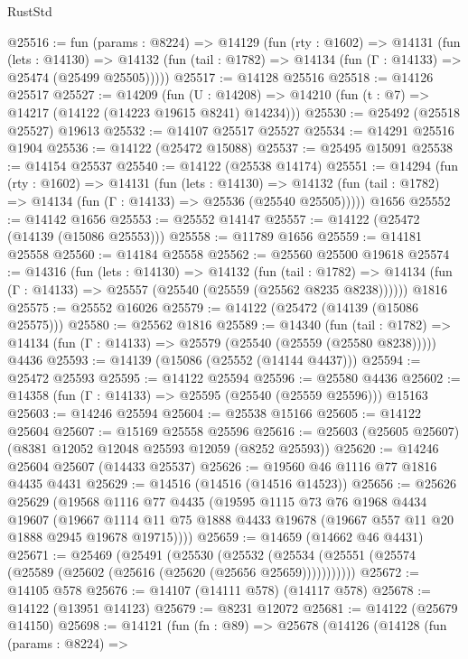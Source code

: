 \begin{lexlean}{RustStd}
\begin{coremodule}
@25516 := fun (params : @8224) =>
  @14129
    (fun (rty : @1602) =>
    @14131
      (fun (lets : @14130) =>
      @14132 (fun (tail : @1782) => @14134 (fun (Γ : @14133) => @25474 (@25499 @25505)))))
@25517 := @14128 @25516
@25518 := @14126 @25517
@25527 := @14209
    (fun (U : @14208) => @14210 (fun (t : @7) => @14217 (@14122 (@14223 @19615 @8241) @14234)))
@25530 := @25492 (@25518 @25527) @19613
@25532 := @14107 @25517 @25527
@25534 := @14291 @25516 @1904
@25536 := @14122 (@25472 @15088)
@25537 := @25495 @15091
@25538 := @14154 @25537
@25540 := @14122 (@25538 @14174)
@25551 := @14294
    (fun (rty : @1602) =>
    @14131
      (fun (lets : @14130) =>
      @14132 (fun (tail : @1782) => @14134 (fun (Γ : @14133) => @25536 (@25540 @25505)))))
    @1656
@25552 := @14142 @1656
@25553 := @25552 @14147
@25557 := @14122 (@25472 (@14139 (@15086 @25553)))
@25558 := @11789 @1656
@25559 := @14181 @25558
@25560 := @14184 @25558
@25562 := @25560 @25500 @19618
@25574 := @14316
    (fun (lets : @14130) =>
    @14132
      (fun (tail : @1782) =>
      @14134 (fun (Γ : @14133) => @25557 (@25540 (@25559 (@25562 @8235 @8238))))))
    @1816
@25575 := @25552 @16026
@25579 := @14122 (@25472 (@14139 (@15086 @25575)))
@25580 := @25562 @1816
@25589 := @14340
    (fun (tail : @1782) => @14134 (fun (Γ : @14133) => @25579 (@25540 (@25559 (@25580 @8238)))))
    @4436
@25593 := @14139 (@15086 (@25552 (@14144 @4437)))
@25594 := @25472 @25593
@25595 := @14122 @25594
@25596 := @25580 @4436
@25602 := @14358 (fun (Γ : @14133) => @25595 (@25540 (@25559 @25596))) @15163
@25603 := @14246 @25594
@25604 := @25538 @15166
@25605 := @14122 @25604
@25607 := @15169 @25558 @25596
@25616 := @25603 (@25605 @25607) (@8381 @12052 @12048 @25593 @12059 (@8252 @25593))
@25620 := @14246 @25604 @25607 (@14433 @25537)
@25626 := @19560 @46 @1116 @77 @1816 @4435 @4431
@25629 := @14516 (@14516 (@14516 @14523))
@25656 := @25626
    @25629
    (@19568
      @1116
      @77
      @4435
      (@19595
        @1115
        @73
        @76
        @1968
        @4434
        @19607
        (@19667 @1114 @11 @75 @1888 @4433 @19678 (@19667 @557 @11 @20 @1888 @2945 @19678 @19715))))
@25659 := @14659 (@14662 @46 @4431)
@25671 := @25469
    (@25491
      (@25530
        (@25532 (@25534 (@25551 (@25574 (@25589 (@25602 (@25616 (@25620 (@25656 @25659)))))))))))
@25672 := @14105 @578
@25676 := @14107 (@14111 @578) (@14117 @578)
@25678 := @14122 (@13951 @14123)
@25679 := @8231 @12072
@25681 := @14122 (@25679 @14150)
@25698 := @14121
    (fun (fn : @89) =>
    @25678
      (@14126
        (@14128
          (fun (params : @8224) =>

\end{coremodule}
\end{lexlean}
